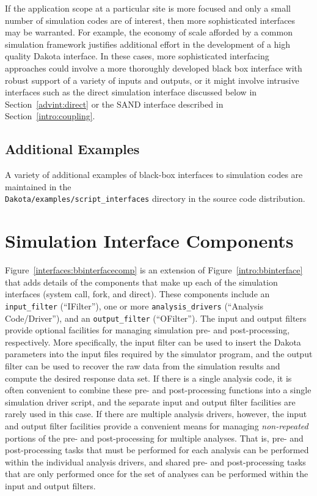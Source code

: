 If the application scope at a particular site is more focused and only
a small number of simulation codes are of interest, then more
sophisticated interfaces may be warranted. For example, the economy of
scale afforded by a common simulation framework justifies additional
effort in the development of a high quality Dakota interface. In these
cases, more sophisticated interfacing approaches could involve a more
thoroughly developed black box interface with robust support of a
variety of inputs and outputs, or it might involve intrusive
interfaces such as the direct simulation interface discussed below in
Section~\ref{advint:direct} or the SAND interface described in
Section~\ref{intro:coupling}.

\subsection{Additional Examples}

A variety of additional examples of black-box interfaces to simulation
codes are maintained in the\\
\texttt{Dakota/examples/script\_interfaces} directory in the source
code distribution.


\section{Simulation Interface Components}\label{interfaces:components}


Figure~\ref{interfaces:bbinterfacecomp} is an extension of
Figure~\ref{intro:bbinterface} that adds details of the
components that make up each of the simulation interfaces (system
call, fork, and direct).  These components include an
\texttt{input\_filter} (``IFilter''), one or more
\texttt{analysis\_drivers} (``Analysis Code/Driver''), and an
\texttt{output\_filter} (``OFilter''). The input and output filters
provide optional facilities for managing simulation pre- and
post-processing, respectively. More specifically, the input filter can
be used to insert the Dakota parameters into the input files required
by the simulator program, and the output filter can be used to recover
the raw data from the simulation results and compute the desired
response data set. If there is a single analysis code, it is often
convenient to combine these pre- and post-processing functions into a
single simulation driver script, and the separate input and output
filter facilities are rarely used in this case. If there are multiple
analysis drivers, however, the input and output filter facilities
provide a convenient means for managing \emph{non-repeated} portions of
the pre- and post-processing for multiple analyses. That is, pre- and
post-processing tasks that must be performed for each analysis can be
performed within the individual analysis drivers, and shared pre- and
post-processing tasks that are only performed once for the set of
analyses can be performed within the input and output filters.

